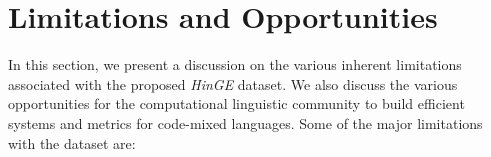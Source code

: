 \documentclass[11pt]{article}
\begin{document}
\begin{table}[!tbh]
\caption{Comparison of correlation between evaluation metrics and human scores for WAC and PAC.}
\label{tab:corr}
\end{table}

\section{Limitations and Opportunities}
In this section, we present a discussion on the various inherent limitations associated with the proposed \textit{HinGE} dataset. We also discuss the various opportunities for the computational linguistic community to build efficient systems and metrics for code-mixed languages. Some of the major limitations with the dataset are:
\end{document}
